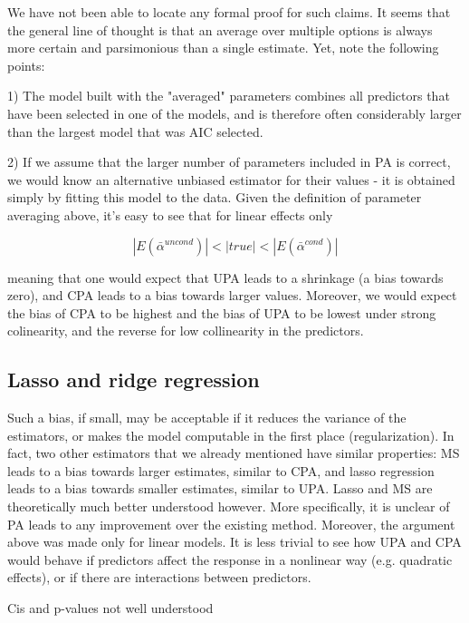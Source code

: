 \documentclass[5p]{elsarticle}
\begin{document}
We have not been able to locate any formal proof for such claims. It seems that the general line of thought is that an average over multiple options is always more certain and parsimonious than a single estimate. Yet, note the following points: 

1) The model built with the "averaged" parameters combines all predictors that have been selected in one of the models, and is therefore often considerably larger than the largest model that was AIC selected. 

2) If we assume that the larger number of parameters included in PA is correct, we would know an alternative unbiased estimator for their values - it is obtained simply by fitting this model to the data. Given the definition of parameter averaging above, it's easy to see that for linear effects only

\begin{equation}
 |E(\bar{\alpha}^{uncond}) | < | true | < | E(\bar{\alpha}^{cond}) | 
\label{eq: averaged parameters }
\end{equation}

meaning that one would expect that UPA leads to a shrinkage (a bias towards zero), and CPA leads to a bias towards larger values. Moreover, we would expect the bias of CPA to be highest and the bias of UPA to be lowest under strong colinearity, and the reverse for low collinearity in the predictors.  

\subsection{Lasso and ridge regression}

Such a bias, if small, may be acceptable if it reduces the variance of the estimators, or makes the model computable in the first place (regularization). In fact, two other estimators that we already mentioned have similar properties: MS leads to a bias towards larger estimates, similar to CPA, and lasso regression leads to a bias towards smaller estimates, similar to UPA. Lasso and MS are theoretically much better understood however. More specifically, it is unclear of PA leads to any improvement over the existing method. Moreover, the argument above was made only for linear models. It is less trivial to see how UPA and CPA would behave if predictors affect the response in a nonlinear way (e.g. quadratic effects), or if there are interactions between predictors. 

Cis and p-values not well understood \citep{Javanmard-Confidenceintervalsand-2014}
\end{document}
